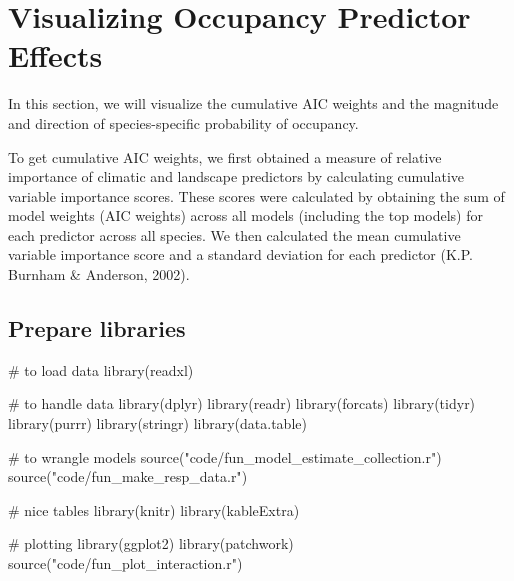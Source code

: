 \documentclass[]{article}
\newenvironment{Shaded}{}{}
\newcommand{\CommentTok}[1]{\textcolor[rgb]{0.00,0.50,0.00}{#1}}
\newcommand{\KeywordTok}[1]{\textcolor[rgb]{0.00,0.00,1.00}{#1}}
\newcommand{\NormalTok}[1]{#1}
\newcommand{\StringTok}[1]{\textcolor[rgb]{0.00,0.50,0.50}{#1}}
\begin{document}
\hypertarget{visualizing-occupancy-predictor-effects}{%
\section{Visualizing Occupancy Predictor Effects}\label{visualizing-occupancy-predictor-effects}}

In this section, we will visualize the cumulative AIC weights and the magnitude and direction of species-specific probability of occupancy.

To get cumulative AIC weights, we first obtained a measure of relative importance of climatic and landscape predictors by calculating cumulative variable importance scores. These scores were calculated by obtaining the sum of model weights (AIC weights) across all models (including the top models) for each predictor across all species. We then calculated the mean cumulative variable importance score and a standard deviation for each predictor (K.P. Burnham \& Anderson, 2002).

\hypertarget{prepare-libraries-3}{%
\subsection{Prepare libraries}\label{prepare-libraries-3}}

\begin{Shaded}
\begin{Highlighting}[numbers=left,,]
\CommentTok{# to load data}
\KeywordTok{library}\NormalTok{(readxl)}

\CommentTok{# to handle data}
\KeywordTok{library}\NormalTok{(dplyr)}
\KeywordTok{library}\NormalTok{(readr)}
\KeywordTok{library}\NormalTok{(forcats)}
\KeywordTok{library}\NormalTok{(tidyr)}
\KeywordTok{library}\NormalTok{(purrr)}
\KeywordTok{library}\NormalTok{(stringr)}
\KeywordTok{library}\NormalTok{(data.table)}

\CommentTok{# to wrangle models}
\KeywordTok{source}\NormalTok{(}\StringTok{"code/fun_model_estimate_collection.r"}\NormalTok{)}
\KeywordTok{source}\NormalTok{(}\StringTok{"code/fun_make_resp_data.r"}\NormalTok{)}

\CommentTok{# nice tables}
\KeywordTok{library}\NormalTok{(knitr)}
\KeywordTok{library}\NormalTok{(kableExtra)}

\CommentTok{# plotting}
\KeywordTok{library}\NormalTok{(ggplot2)}
\KeywordTok{library}\NormalTok{(patchwork)}
\KeywordTok{source}\NormalTok{(}\StringTok{"code/fun_plot_interaction.r"}\NormalTok{)}
\end{Highlighting}
\end{Shaded}
\end{document}
